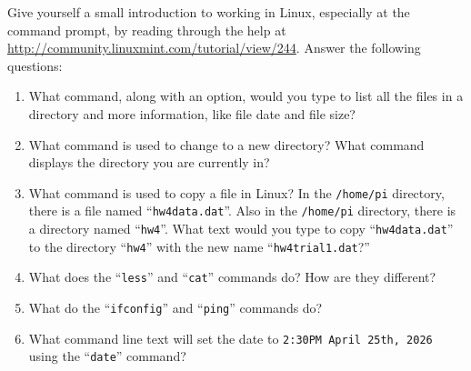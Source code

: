 \documentclass[11pt]{article}
\begin{document}
%
\MakeAssignmentTitle


Give yourself a small introduction to working in Linux, especially at the command prompt, by reading through the help at \url{http://community.linuxmint.com/tutorial/view/244}. Answer the following questions:
%
\begin{enumerate}
    \item What command, along with an option, would you type to list all the files in a directory and more information, like file date and file size?
    \item What command is used to change to a new directory? What command displays the directory you are currently in?
        \item What command is used to copy a file in Linux? In the \verb|/home/pi| directory, there is a file named “\verb|hw4data.dat|”. Also in the \verb|/home/pi| directory, there is a directory named “\verb|hw4|”. What text would you type to copy “\verb|hw4data.dat|” to the directory “\verb|hw4|” with the new name “\verb|hw4trial1.dat|?”
        \item What does the “\verb|less|” and “\verb|cat|” commands do? How are they different?
        \item What do the “\verb|ifconfig|” and “\verb|ping|” commands do?
        \item What command line text will set the date to \verb|2:30PM April 25th, 2026| using the “\verb|date|” command?
\end{enumerate}
%
\end{document}
